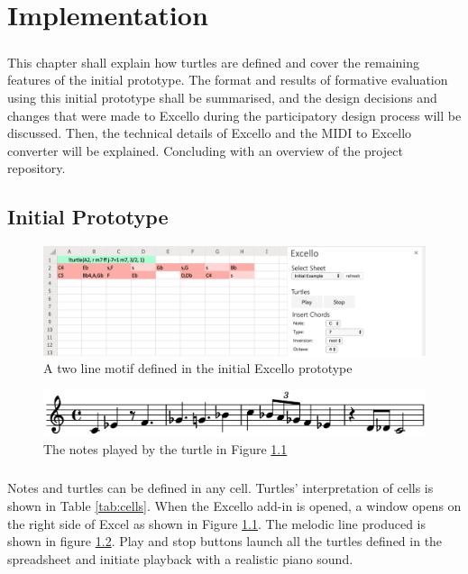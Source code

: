 
\chapter{Implementation}

\paragraph{} This chapter shall explain how turtles are defined and cover the remaining features of the initial prototype. The format and results of formative evaluation using this initial prototype shall be summarised, and the design decisions and changes that were made to Excello during the participatory design process will be discussed. Then, the technical details of Excello and the MIDI to Excello converter will be explained. Concluding with an overview of the project repository.

\section{Initial Prototype}

\begin{figure}[tbh]
\centerline{\includegraphics[width=150mm]{figs/initialPrototype.png}}
\caption{A two line motif defined in the initial Excello prototype}
\label{implementation:initialPrototype}
\end{figure}
\begin{figure}[tbh]
\centerline{\includegraphics[width=150mm]{figs/initialScore.png}}
\caption{The notes played by the turtle in Figure \ref{implementation:initialPrototype}}
\label{implementation:initialScore}
\end{figure}

\vspace{-10pt}
\paragraph{} Notes and turtles can be defined in any cell. Turtles' interpretation of cells is shown in Table \ref{tab:cells}. When the Excello add-in is opened, a window opens on the right side of Excel as shown in Figure \ref{implementation:initialPrototype}. The melodic line produced is shown in figure \ref{implementation:initialScore}. Play and stop buttons launch all the turtles defined in the spreadsheet and initiate playback with a realistic piano sound.

